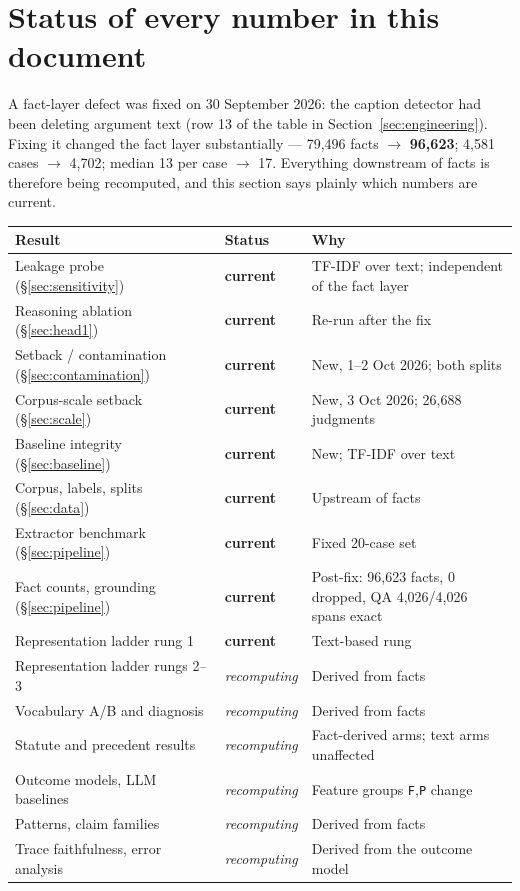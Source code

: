 \documentclass[12pt,a4paper]{article}
\newcommand{\code}[1]{\texttt{\small #1}}
\begin{document}
\section{Status of every number in this document}\label{sec:status}

A fact-layer defect was fixed on 30 September 2026: the caption detector had been deleting argument
text (row 13 of the table in Section~\ref{sec:engineering}). Fixing it changed the fact layer
substantially --- 79,496 facts $\rightarrow$ \textbf{96,623}; 4,581 cases $\rightarrow$ 4,702; median
13 per case $\rightarrow$ 17. Everything downstream of facts is therefore being recomputed, and this
section says plainly which numbers are current.

\begin{center}
\begin{tabular}{@{}llp{6.4cm}@{}}
\toprule
\textbf{Result} & \textbf{Status} & \textbf{Why} \\
\midrule
Leakage probe (§\ref{sec:sensitivity})      & \textbf{current} & TF-IDF over text; independent of the fact layer \\
Reasoning ablation (§\ref{sec:head1})       & \textbf{current} & Re-run after the fix \\
Setback / contamination (§\ref{sec:contamination}) & \textbf{current} & New, 1--2 Oct 2026; both splits \\
Corpus-scale setback (§\ref{sec:scale}) & \textbf{current} & New, 3 Oct 2026; 26,688 judgments \\
Baseline integrity (§\ref{sec:baseline}) & \textbf{current} & New; TF-IDF over text \\
Corpus, labels, splits (§\ref{sec:data})    & \textbf{current} & Upstream of facts \\
Extractor benchmark (§\ref{sec:pipeline})   & \textbf{current} & Fixed 20-case set \\
Fact counts, grounding (§\ref{sec:pipeline}) & \textbf{current} & Post-fix: 96,623 facts, 0 dropped, QA 4,026/4,026 spans exact \\
\midrule
Representation ladder rung 1                & \textbf{current} & Text-based rung \\
Representation ladder rungs 2--3            & \emph{recomputing} & Derived from facts \\
Vocabulary A/B and diagnosis                & \emph{recomputing} & Derived from facts \\
Statute and precedent results               & \emph{recomputing} & Fact-derived arms; text arms unaffected \\
Outcome models, LLM baselines               & \emph{recomputing} & Feature groups \code{F},\code{P} change \\
Patterns, claim families                    & \emph{recomputing} & Derived from facts \\
Trace faithfulness, error analysis          & \emph{recomputing} & Derived from the outcome model \\
\bottomrule
\end{tabular}
\end{center}
\end{document}
